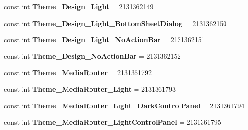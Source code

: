 \begin{DoxyCompactItemize}
const int {\bfseries Theme\+\_\+\+Design\+\_\+\+Light} = 2131362149
\item 
\mbox{\label{class_sample_app_1_1_droid_1_1_resource_1_1_style_a953c2e38da59eee83611032bf2f3e409}} 
const int {\bfseries Theme\+\_\+\+Design\+\_\+\+Light\+\_\+\+Bottom\+Sheet\+Dialog} = 2131362150
\item 
\mbox{\label{class_sample_app_1_1_droid_1_1_resource_1_1_style_a5286989ee67c209321ec740c82814c93}} 
const int {\bfseries Theme\+\_\+\+Design\+\_\+\+Light\+\_\+\+No\+Action\+Bar} = 2131362151
\item 
\mbox{\label{class_sample_app_1_1_droid_1_1_resource_1_1_style_a9638ffae4896552c582a63a06c7237c7}} 
const int {\bfseries Theme\+\_\+\+Design\+\_\+\+No\+Action\+Bar} = 2131362152
\item 
\mbox{\label{class_sample_app_1_1_droid_1_1_resource_1_1_style_a4d1a5f76321aff5d684ac5e5b813dc53}} 
const int {\bfseries Theme\+\_\+\+Media\+Router} = 2131361792
\item 
\mbox{\label{class_sample_app_1_1_droid_1_1_resource_1_1_style_a649fc35882b6e7fb5f5b1ce8b534e7d9}} 
const int {\bfseries Theme\+\_\+\+Media\+Router\+\_\+\+Light} = 2131361793
\item 
\mbox{\label{class_sample_app_1_1_droid_1_1_resource_1_1_style_a2fd0e8859ca7bbed02bd01982ee26edd}} 
const int {\bfseries Theme\+\_\+\+Media\+Router\+\_\+\+Light\+\_\+\+Dark\+Control\+Panel} = 2131361794
\item 
\mbox{\label{class_sample_app_1_1_droid_1_1_resource_1_1_style_ab06c0f02fdeb99343e58ceabe071cc0a}} 
const int {\bfseries Theme\+\_\+\+Media\+Router\+\_\+\+Light\+Control\+Panel} = 2131361795
\item 
\mbox{\label{class_sample_app_1_1_droid_1_1_resource_1_1_style_adf64e04ebd31f51fc83a94edc4b43533}} 

\end{DoxyCompactItemize}
